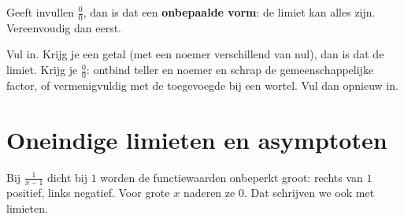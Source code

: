 Geeft invullen $\frac00$, dan is dat een \textbf{onbepaalde vorm}: de limiet kan alles zijn. Vereenvoudig dan eerst.


\begin{oefeningen}
\end{oefeningen}


\begin{oefeningen}
\end{oefeningen}

\begin{werkwijze}
Vul in. Krijg je een getal (met een noemer verschillend van nul), dan is dat de limiet. Krijg je $\frac00$: ontbind teller en noemer en schrap de gemeenschappelijke factor, of vermenigvuldig met de toegevoegde bij een wortel. Vul dan opnieuw in.
\end{werkwijze}

\begin{oefeningen}
\end{oefeningen}

\section{Oneindige limieten en asymptoten}

Bij $\frac{1}{x - 1}$ dicht bij $1$ worden de functiewaarden onbeperkt groot: rechts van $1$ positief, links negatief. Voor grote $x$ naderen ze $0$. Dat schrijven we ook met limieten.


